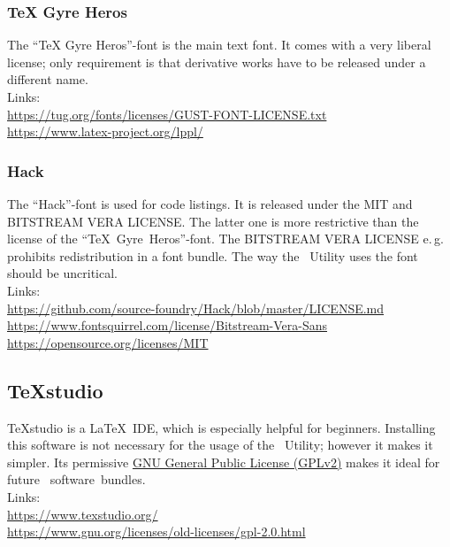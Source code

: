 			\subsubsection{TeX Gyre Heros}
				The \enquote{TeX Gyre Heros}-font is the main text font. It comes with a very liberal license; only requirement is that derivative works
				have to be released under a different name.\\[0.25cm]
				Links:\\[0.25cm]
				\textcolor{docartTurquoise!75}{\href{https://tug.org/fonts/licenses/GUST-FONT-LICENSE.txt}{https://tug.org/fonts/licenses/GUST-FONT-LICENSE.txt}}\\
				\textcolor{docartTurquoise!75}{\href{https://www.latex-project.org/lppl/}{https://www.latex-project.org/lppl/}}
			
			\subsubsection{Hack}
				The \enquote{Hack}-font is used for code listings. It is released under the MIT and BITSTREAM VERA LICENSE. The latter one is more restrictive than the license of the \mbox{\enquote{TeX Gyre Heros}-font}. The BITSTREAM VERA LICENSE \mbox{e.\,g.} prohibits redistribution in a font bundle. The way the \productName~Utility uses the font should be uncritical.\\[0.25cm]
				Links:\\[0.25cm]
				\textcolor{docartTurquoise!75}{\href{https://github.com/source-foundry/Hack/blob/master/LICENSE.md}{https://github.com/source-foundry/Hack/blob/master/LICENSE.md}}\\
				\textcolor{docartTurquoise!75}{\href{https://www.fontsquirrel.com/license/Bitstream-Vera-Sans}{https://www.fontsquirrel.com/license/Bitstream-Vera-Sans}}\\
				\textcolor{docartTurquoise!75}{\href{https://opensource.org/licenses/MIT}{https://opensource.org/licenses/MIT}}
				
				
		\subsection{TeXstudio}
			TeXstudio is a \LaTeX~IDE, which is especially helpful for beginners. Installing this software is not necessary for the usage of the \productName~Utility; however it makes it simpler. Its permissive \href{https://www.gnu.org/licenses/old-licenses/gpl-2.0.html}{GNU General Public License (GPLv2)} makes it ideal for future \productName~software~bundles.\\[0.25cm]
			Links:\\[0.25cm]
			\textcolor{docartTurquoise!75}{\href{https://www.texstudio.org/}{https://www.texstudio.org/}}\\
			\textcolor{docartTurquoise!75}{\href{https://www.gnu.org/licenses/old-licenses/gpl-2.0.html}{https://www.gnu.org/licenses/old-licenses/gpl-2.0.html}}
		